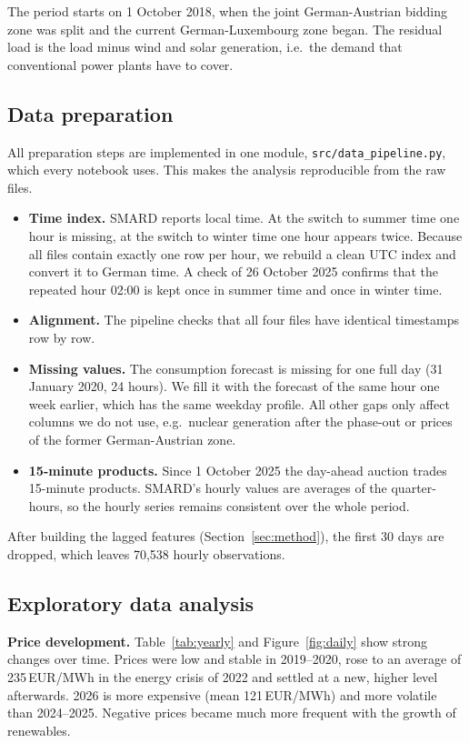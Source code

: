 \documentclass[12pt,oneside]{article}
\begin{document}
The period starts on 1 October 2018, when the joint German-Austrian bidding zone was split and the current German-Luxembourg zone began. The residual load is the load minus wind and solar generation, i.e.\ the demand that conventional power plants have to cover.

\subsection{Data preparation}

All preparation steps are implemented in one module, \texttt{src/data\_pipeline.py}, which every notebook uses. This makes the analysis reproducible from the raw files.

\begin{itemize}
    \item \textbf{Time index.} SMARD reports local time. At the switch to summer time one hour is missing, at the switch to winter time one hour appears twice. Because all files contain exactly one row per hour, we rebuild a clean UTC index and convert it to German time. A check of 26 October 2025 confirms that the repeated hour 02:00 is kept once in summer time and once in winter time.
    \item \textbf{Alignment.} The pipeline checks that all four files have identical timestamps row by row.
    \item \textbf{Missing values.} The consumption forecast is missing for one full day (31 January 2020, 24 hours). We fill it with the forecast of the same hour one week earlier, which has the same weekday profile. All other gaps only affect columns we do not use, e.g.\ nuclear generation after the phase-out or prices of the former German-Austrian zone.
    \item \textbf{15-minute products.} Since 1 October 2025 the day-ahead auction trades 15-minute products. SMARD's hourly values are averages of the quarter-hours, so the hourly series remains consistent over the whole period.
\end{itemize}

After building the lagged features (Section~\ref{sec:method}), the first 30 days are dropped, which leaves 70,538 hourly observations.

\subsection{Exploratory data analysis}

\textbf{Price development.} Table~\ref{tab:yearly} and Figure~\ref{fig:daily} show strong changes over time. Prices were low and stable in 2019--2020, rose to an average of 235\,EUR/MWh in the energy crisis of 2022 and settled at a new, higher level afterwards. 2026 is more expensive (mean 121\,EUR/MWh) and more volatile than 2024--2025. Negative prices became much more frequent with the growth of renewables.
\end{document}
